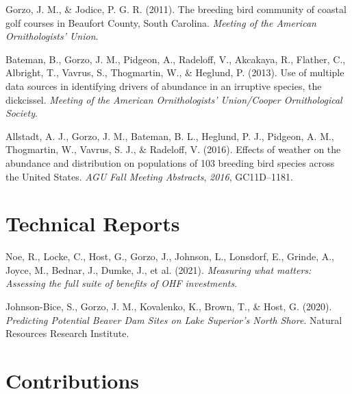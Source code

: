\documentclass[11pt,a4paper,]{awesome-cv}
\newlength{\cslhangindent}
\newenvironment{CSLReferences}[2] %
 {\begin{list}{}{%
  \setlength{\itemindent}{0pt}
  \setlength{\leftmargin}{0pt}
  \setlength{\parsep}{0pt}
  \ifodd #1
   \setlength{\leftmargin}{\cslhangindent}
   \setlength{\itemindent}{-1\cslhangindent}
  \fi
  \setlength{\itemsep}{#2\baselineskip}}}
 {\end{list}}
\begin{document}
\begin{CSLReferences}{1}{0}
Gorzo, J. M., \& Jodice, P. G. R. (2011). The breeding bird community of
coastal golf courses in Beaufort County, South Carolina. \emph{Meeting
of the American Ornithologists' Union}.

Bateman, B., Gorzo, J. M., Pidgeon, A., Radeloff, V., Akcakaya, R.,
Flather, C., Albright, T., Vavrus, S., Thogmartin, W., \& Heglund, P.
(2013). Use of multiple data sources in identifying drivers of abundance
in an irruptive species, the dickcissel. \emph{Meeting of the American
Ornithologists' Union/Cooper Ornithological Society}.

Allstadt, A. J., Gorzo, J. M., Bateman, B. L., Heglund, P. J., Pidgeon,
A. M., Thogmartin, W., Vavrus, S. J., \& Radeloff, V. (2016). Effects of
weather on the abundance and distribution on populations of 103 breeding
bird species across the United States. \emph{AGU Fall Meeting
Abstracts}, \emph{2016}, GC11D--1181.

\end{CSLReferences}

\section{Technical Reports}\label{technical-reports}

\label{refs-ca99a927caf9c71eb24e8f38ad257e5a}
\begin{CSLReferences}{1}{0}
Noe, R., Locke, C., Host, G., Gorzo, J., Johnson, L., Lonsdorf, E.,
Grinde, A., Joyce, M., Bednar, J., Dumke, J., et al. (2021).
\emph{Measuring what matters: Assessing the full suite of benefits of
OHF investments}.

Johnson-Bice, S., Gorzo, J. M., Kovalenko, K., Brown, T., \& Host, G.
(2020). \emph{Predicting Potential Beaver Dam Sites on Lake Superior's
North Shore}. Natural Resources Research Institute.

\end{CSLReferences}

\section{Contributions}\label{contributions}
\end{document}
